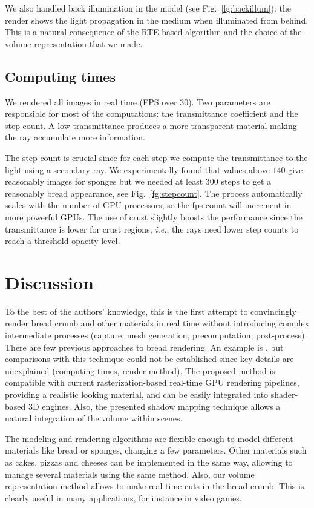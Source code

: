 We also handled back illumination in the model (see Fig.~\ref{fg:backillum}): the render shows the light propagation in the medium when illuminated from behind.
This is a natural consequence of the RTE based algorithm and the choice of the volume representation that we made.

\subsection*{Computing times}

We rendered all images in real time (FPS over 30). Two parameters are responsible for most of the computations: the transmittance coefficient and the step count.
A low transmittance produces a more transparent material making the ray accumulate more information.

The step count is crucial since for each step we compute the transmittance to the light using a secondary ray.
We experimentally found that values above $140$ give reasonably images for sponges but we needed at least $300$ steps to get a reasonably bread appearance, see Fig.~\ref{fg:stepcount}.
The process automatically scales with the number of GPU processors, so the fps count will increment in more powerful GPUs. 
The use of crust slightly boosts the performance since the transmittance is lower for crust regions, {\em i.e.}, the rays need lower step counts to reach a threshold opacity level.


\section*{Discussion}

To the best of the authors' knowledge, this is the first attempt to convincingly render bread crumb and other materials in real time without introducing complex intermediate processes (capture, mesh generation, precomputation, post-process).
There are few previous approaches to bread rendering. An example is \cite{Cho2007}, but comparisons with this technique could not be established since key details are unexplained (computing times, render method).
The proposed method is compatible with current rasterization-based real-time GPU rendering pipelines, providing a realistic looking material, and can be easily integrated into  shader-based 3D engines.
Also, the presented shadow mapping technique allows a natural integration of the volume within scenes. 

The modeling and rendering algorithms are flexible enough to model different materials like bread or sponges, changing a few parameters.
Other materials such as cakes, pizzas and cheeses can be implemented in the same way, allowing to manage several materials using the same method.
Also, our volume representation method allows to make real time cuts in the bread crumb.
This is clearly useful in many applications, for instance in video games.

